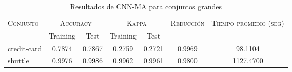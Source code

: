 \begin{table}[]
\centering
\begin{tabular}{l c c c c c c}
\hline
\multirow{2}{*}{\textsc{Conjunto}}
	& \multicolumn{2}{c}{\textsc{Accuracy}}
	& \multicolumn{2}{c}{\textsc{Kappa}}
	& \textsc{Reducción}
	& \textsc{Tiempo promedio (seg)} \\
	& Training & Test
	& Training & Test \\ 
\hline
\hline

credit-card & 0.7874 & 0.7867 & 0.2759 & 0.2721 & 0.9969 & 98.1104 \\
shuttle & 0.9976 & 0.9986 & 0.9962 & 0.9961 & 0.9800 & 1127.4700 \\

\hline
\end{tabular}
\caption{Resultados de CNN-MA para conjuntos grandes }
\label{res-grande-CNN-MA}
\end{table}

